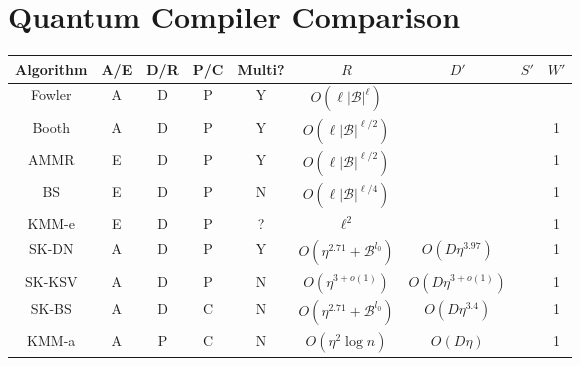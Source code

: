 \section{Quantum Compiler Comparison}
\label{sec:qcompile-compare}

\begin{landscape}

\begin{table}[hbt!]
\begin{center}
\begin{tabular}{|c|c|c|c|c|c|c|c|c|}
\hline
Algorithm                  & A/E & D/R & P/C & Multi? & $R$                             & $D'$                    & $S'$                  & $W'$ \\
\hline
Fowler\cite{Fowler2011}     & A   & D   & P  & Y    & $O(\ell |\mathcal{B}|^{\ell})$    &                         &                       &     \\
Booth \cite{Booth2012}      & A   & D   & P  & Y    & $O(\ell |\mathcal{B}|^{\ell/2})$  &                         &                       & 1    \\
\hline
AMMR \cite{Amy2012}         & E   & D   & P  & Y    & $O(\ell |\mathcal{B}|^{\ell/2})$  &                         &                       & 1    \\
BS \cite{Bocharov2012}      & E   & D   & P  & N    & $O(\ell |\mathcal{B}|^{\ell/4})$  &                         &                       & 1    \\
KMM-e\cite{Kliuchnikov2012e} & E   & D   & P  & ?    & $\ell^2$                          &                         &                       & 1    \\
\hline
SK-DN\cite{Dawson2005}      & A   & D   & P  & Y    & $O(\eta^{2.71} + \mathcal{B}^{l_0})$ & $O(D \eta^{3.97})$         &                       & 1    \\
SK-KSV\cite{Kitaev2002}     & A   & D   & P  & N    & $O(\eta^{3+o(1)})$                   & $O(D \eta^{3+o(1)})$        &                       & 1    \\
SK-BS \cite{Bocharov2012}   & A   & D   & C  & N    & $O(\eta^{2.71} + \mathcal{B}^{l_0})$ & $O(D\eta^{3.4})$           &                       & 1    \\
KMM-a\cite{Kliuchnikov2012a}& A   & P   & C  & N    & $O(\eta^2\log n)$                    & $O(D\eta)$                 &                       & 1    \\

\end{tabular}
\end{center}
\end{table}
\end{landscape}
